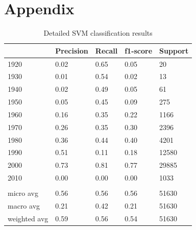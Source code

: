 \documentclass{article}
\begin{document}


\pagebreak
\newpage
\clearpage

\section*{Appendix}

\begin{table}[ht]
\caption{Detailed SVM classification results  }

\label{tab1}
\centering
\begin{tabular}{lllll}
\hline
             & Precision & Recall & f1-score & Support \\ \hline
1920         & 0.02      & 0.65   & 0.05     & 20      \\
1930         & 0.01      & 0.54   & 0.02     & 13      \\
1940         & 0.02      & 0.49   & 0.05     & 61      \\
1950         & 0.05      & 0.45   & 0.09     & 275     \\
1960         & 0.16      & 0.35   & 0.22     & 1166    \\
1970         & 0.26      & 0.35   & 0.30     & 2396    \\
1980         & 0.36      & 0.44   & 0.40     & 4201    \\
1990         & 0.51      & 0.11   & 0.18     & 12580   \\
2000         & 0.73      & 0.81   & 0.77     & 29885   \\
2010         & 0.00      & 0.00   & 0.00     & 1033    \\ \hline
             &           &        &          &         \\ \hline
micro avg    & 0.56      & 0.56   & 0.56     & 51630   \\
macro avg    & 0.21      & 0.42   & 0.21     & 51630   \\
weighted avg & 0.59      & 0.56   & 0.54     & 51630   \\ \hline
\end{tabular}
\end{table}
\end{document}
